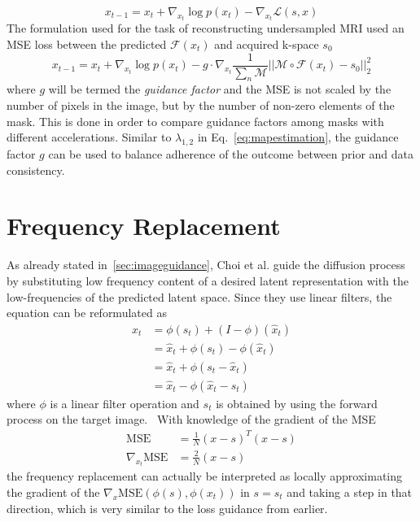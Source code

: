 \begin{equation}
    x_{t-1} = x_{t} + \nabla_{x_t} \log p(x_t) - \nabla_{x_t} \mathcal{L}(s, x)
\end{equation}
The formulation used for the task of reconstructing undersampled MRI used an MSE loss between the predicted $\mathcal{F}(x_t)$ and acquired k-space $s_0$
\begin{equation}
    x_{t-1} = x_{t} + \nabla_{x_t} \log p(x_t) - g \cdot \nabla_{x_t} \frac{1}{\sum_n \mathcal{M}}||\mathcal{M} \circ \mathcal{F}(x_t) - s_0||_2^2
\end{equation}
where $g$ will be termed the \textit{guidance factor} and the MSE is not scaled by the number of pixels in the image, but by the number of non-zero elements of the mask. This is done in order to compare guidance factors among masks with different accelerations. Similar to $\lambda_{1,2}$ in Eq.~\ref{eq:mapestimation}, the guidance factor $g$ can be used to balance adherence of the outcome between prior and data consistency.

\section{Frequency Replacement}
\label{sec:freqreplacement}
As already stated in~\ref{sec:imageguidance}, Choi et al. guide the diffusion process by substituting low frequency content of a desired latent representation with the low-frequencies of the predicted latent space. Since they use linear filters, the equation can be reformulated as
\begin{align}
    \label{eq:ilvr}
    x_{t} & = \phi(s_{t}) + (I - \phi) (\hat{x}_{t})        \\
          & = \hat{x}_{t} + \phi(s_{t}) - \phi(\hat{x}_{t}) \\
          & = \hat{x}_{t} + \phi(s_{t} - \hat{x}_{t})       \\
          & = \hat{x}_{t} - \phi(\hat{x}_{t} - s_{t})
\end{align}
where $\phi$ is a linear filter operation and $s_t$ is obtained by using the forward process on the target image.~\autocite{choi2021ilvr} With knowledge of the gradient of the MSE
\begin{align}
    \text{MSE}              & = \frac{1}{N} (x - s)^T (x - s) \\
    \nabla_{x_t} \text{MSE} & = \frac{2}{N} (x - s)
\end{align}
the frequency replacement can actually be interpreted as locally approximating the gradient of the $\nabla_{x}\text{MSE}(\phi(s), \phi(x_{t}))$ in $s=s_t$ and taking a step in that direction, which is very similar to the loss guidance from earlier.

